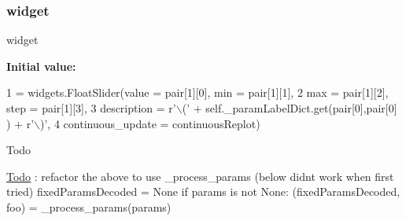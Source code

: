 \mbox{\label{namespace_mu_mo_t_1_1_mu_mo_t_a60d5947424f4fcd4ca9ed05e6dc43227}} 
\subsubsection{\texorpdfstring{widget}{widget}}
{\footnotesize\ttfamily widget}

{\bfseries Initial value\+:}
\begin{DoxyCode}
1 =  widgets.FloatSlider(value = pair[1][0], min = pair[1][1], 
2                                              max = pair[1][2], step = pair[1][3], 
3                                              description = \textcolor{stringliteral}{r'\(\backslash\)('} + self.\_paramLabelDict.get(pair[0],pair[0]
      ) + \textcolor{stringliteral}{r'\(\backslash\))'}, 
4                                              continuous\_update = continuousReplot)
\end{DoxyCode}
\begin{DoxyRefDesc}{Todo}
\item[\hyperlink{todo__todo000001}{Todo}]\+: refactor the above to use \+\_\+process\+\_\+params (below didn\textquotesingle{}t work when first tried) fixed\+Params\+Decoded = None if params is not None\+: (fixed\+Params\+Decoded, foo) = \+\_\+process\+\_\+params(params) \end{DoxyRefDesc}
